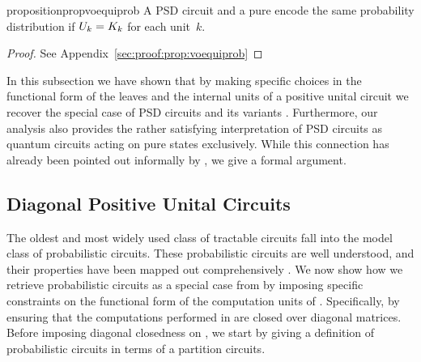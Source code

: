 \begin{restatable}{proposition}{propvoequiprob}
	\label{prop:voequiprob}
	A PSD circuit and a pure \punc encode the same probability distribution if $U_k=K_k$ for each unit~$k$.
\end{restatable}



\begin{proof}
	See Appendix~\ref{sec:proof:prop:voequiprob}
\end{proof}

In this subsection we have shown that by making specific choices in the functional form of the leaves and the internal units of a positive unital circuit we recover the special case of PSD circuits and its variants \citep{loconte2024subtractive,loconte2025sum}. Furthermore, our analysis also provides the rather satisfying interpretation of PSD circuits as quantum circuits acting on pure states exclusively. While this connection has already been pointed out informally by \citet{wangrelationship}, we give a formal argument.




















\subsection{Diagonal Positive Unital Circuits}
\label{sec:diagcircuits}

The oldest and most widely used class of tractable circuits fall into the model class of probabilistic circuits. These probabilistic circuits are well understood, and their properties have been mapped out comprehensively \citep{vergari2021compositional}. We now show how we retrieve probabilistic circuits as a special case from \puncs by imposing specific constraints on the functional form of the computation units of \puncs. Specifically, by ensuring that the computations performed in \puncs are closed over diagonal matrices. Before imposing diagonal closedness on \puncs, we start by giving a definition of probabilistic circuits in terms of a partition circuits.




